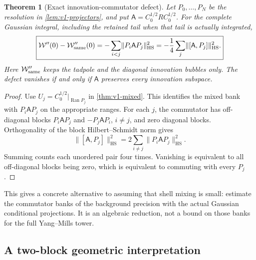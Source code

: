 \documentclass[11pt,a4paper]{article}
\newtheorem{theorem}{Theorem}[section]
\theoremstyle{definition}
\theoremstyle{remark}
\DeclareMathOperator{\Ran}{Ran}
\newcommand{\norm}[1]{\lVert #1\rVert}
\newcommand{\HS}{\mathrm{HS}}
\begin{document}
\begin{theorem}[Exact innovation-commutator defect]
\label{thm:v1-commutator}
Let $P_0,\ldots,P_N$ be the resolution in \cref{lem:v1-projectors}, and
put $\mathsf A=C_0^{1/2}RC_0^{1/2}$. For the complete Gaussian integral,
including the retained tail when that tail is actually integrated,
\begin{equation}\label{eq:v1-commutator}
 \boxed{\displaystyle
 \mathcal W''(0)-\mathcal W''_{\rm same}(0)
 =-\sum_{i<j}\norm{P_i\mathsf AP_j}_\HS^2
 =-\frac14\sum_j\norm{[\mathsf A,P_j]}_\HS^2.}
\end{equation}
Here $\mathcal W''_{\rm same}$ keeps the tadpole and the diagonal
innovation bubbles only. The defect vanishes if and only if
$\mathsf A$ preserves every innovation subspace.
\end{theorem}
\begin{proof}
Use $U_j=C_0^{1/2}|_{\Ran P_j}$ in \cref{thm:v1-mixed}. This identifies
the mixed bank with $P_i\mathsf AP_j$ on the appropriate ranges.
For each $j$, the commutator has off-diagonal blocks
$P_i\mathsf AP_j$ and $-P_j\mathsf AP_i$, $i\ne j$, and zero diagonal
blocks. Orthogonality of the block Hilbert--Schmidt norm gives
\[
 \norm{[\mathsf A,P_j]}_\HS^2
             =2\sum_{i\ne j}\norm{P_i\mathsf AP_j}_\HS^2.
\]
Summing counts each unordered pair four times. Vanishing is equivalent
to all off-diagonal blocks being zero, which is equivalent to commuting
with every $P_j$.
\end{proof}

This gives a concrete alternative to assuming that shell mixing is
small: estimate the commutator banks of the background precision with
the actual Gaussian conditional projections. It is an algebraic
reduction, not a bound on those banks for the full Yang--Mills tower.

\subsection{A two-block geometric interpretation}
\end{document}
